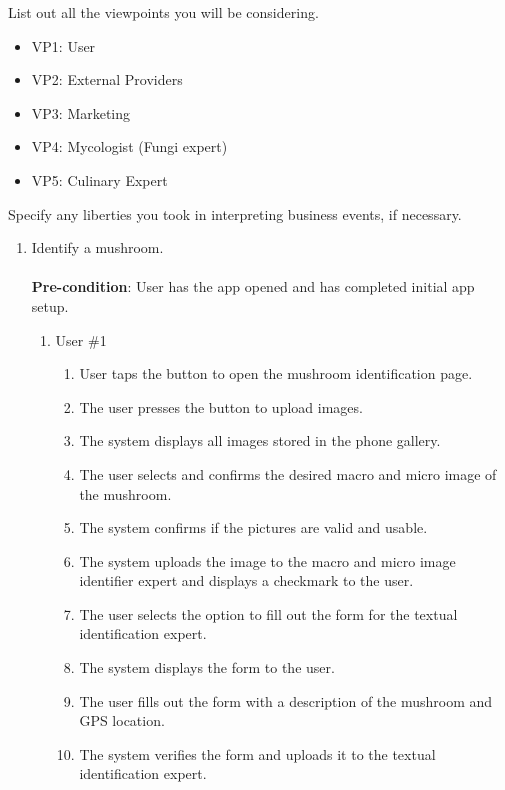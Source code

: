 \documentclass[]{article}
\begin{document}
 List out all the viewpoints you will be considering.\\

\begin{itemize}
	\item VP1: User
	\item VP2: External Providers
	\item VP3: Marketing
	\item VP4: Mycologist (Fungi expert)
	\item VP5: Culinary Expert
\end{itemize}

 Specify any liberties you took in interpreting business events, if necessary.\\

\begin{enumerate}[{\bf BE1.}]
	\item Identify a mushroom. \\
	\\
	\textbf{Pre-condition}: User has the app opened and has completed initial app setup. 
		\begin{enumerate}[{\bf VP1.}]
			\item User \#1 \\
				\begin{enumerate}[1.]
					\item User taps the button to open the mushroom identification page.
					\item The user presses the button to upload images.
					\item The system displays all images stored in the phone gallery.
					\item The user selects and confirms the desired macro and micro image of the mushroom.
					\item The system confirms if the pictures are valid and usable.
					\item The system uploads the image to the macro and micro image identifier expert and displays a checkmark to the user.
					\item The user selects the option to fill out the form for the textual identification expert. 
					\item The system displays the form to the user.
					\item The user fills out the form with a description of the mushroom and GPS location.
					\item The system verifies the form and uploads it to the textual identification expert.

\end{enumerate}
\end{enumerate}
\end{enumerate}
\end{document}
